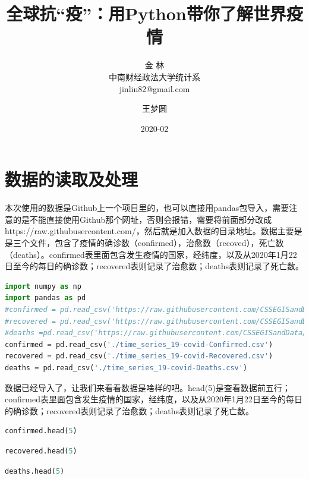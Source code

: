 \documentclass[UTF8,a4paper,12pt]{ctexart}  %
\author{\CJKfamily{kai} 金 \enspace 林 \\ \CJKfamily{kai} 中南财经政法大学统计系 \\ jinlin82@gmail.com}
\title{\LARGE\textbf{全球抗``疫''：用Python带你了解世界疫情}}
\author{王梦圆}
\date{2020-02}
\begin{document}
\maketitle

\section{数据的读取及处理}

本次使用的数据是Github上一个项目里的，也可以直接用pandas包导入，需要注意的是不能直接使用Github那个网址，否则会报错，需要将前面部分改成https://raw.githubusercontent.com/，然后就是加入数据的目录地址。数据主要是是三个文件，包含了疫情的确诊数（confirmed），治愈数（recoved），死亡数（deaths）。confirmed表里面包含发生疫情的国家，经纬度，以及从2020年1月22日至今的每日的确诊数；recovered表则记录了治愈数；deaths表则记录了死亡数。

\begin{lstlisting}[language=Python]
import numpy as np
import pandas as pd
#confirmed = pd.read_csv('https://raw.githubusercontent.com/CSSEGISandData/COVID-19/master/csse_covid_19_data/csse_covid_19_time_series/time_series_19-covid-Confirmed.csv')
#recovered = pd.read_csv('https://raw.githubusercontent.com/CSSEGISandData/COVID-19/master/csse_covid_19_data/csse_covid_19_time_series/time_series_19-covid-Recovered.csv')
#deaths =pd.read_csv('https://raw.githubusercontent.com/CSSEGISandData/COVID-19/master/csse_covid_19_data/csse_covid_19_time_series/time_series_19-covid-Deaths.csv')
confirmed = pd.read_csv('./time_series_19-covid-Confirmed.csv')
recovered = pd.read_csv('./time_series_19-covid-Recovered.csv')
deaths = pd.read_csv('./time_series_19-covid-Deaths.csv')
\end{lstlisting}

数据已经导入了，让我们来看看数据是啥样的吧。head(5)是查看数据前五行；confirmed表里面包含发生疫情的国家，经纬度，以及从2020年1月22日至今的每日的确诊数；recovered表则记录了治愈数；deaths表则记录了死亡数。

\begin{lstlisting}[language=Python]
confirmed.head(5)
\end{lstlisting}

\begin{lstlisting}[language=Python]
recovered.head(5)
\end{lstlisting}

\begin{lstlisting}[language=Python]
deaths.head(5)
\end{lstlisting}
\end{document}
